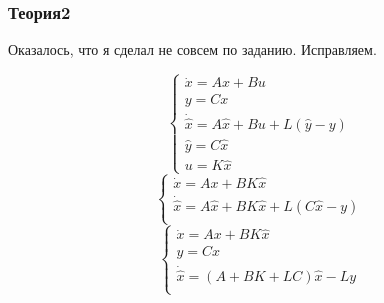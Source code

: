 \subsubsection{Теория2}
Оказалось, что я сделал не совсем по заданию. Исправляем.

\[
  \begin{cases}
    \dot{x} = A x + B u\\
    y = C x \\
    \dot{\hat{x}} = A \hat{x} + B u + L(\hat{y} - y) \\
    \hat{y} = C \hat{x} \\
    u = K \hat{x}
\end{cases}
\]
\[
\begin{cases}
    \dot{x} = A x + B K \hat{x}\\
    \dot{\hat{x}} = A \hat{x} + B K \hat{x} + L(C \hat{x} - y) \\
\end{cases}
\]
\[
\begin{cases}
    \dot{x} = A x + B K \hat{x}\\
    y = Cx \\
    \dot{\hat{x}} = (A + B K + LC) \hat{x} - Ly \\
\end{cases}
\]